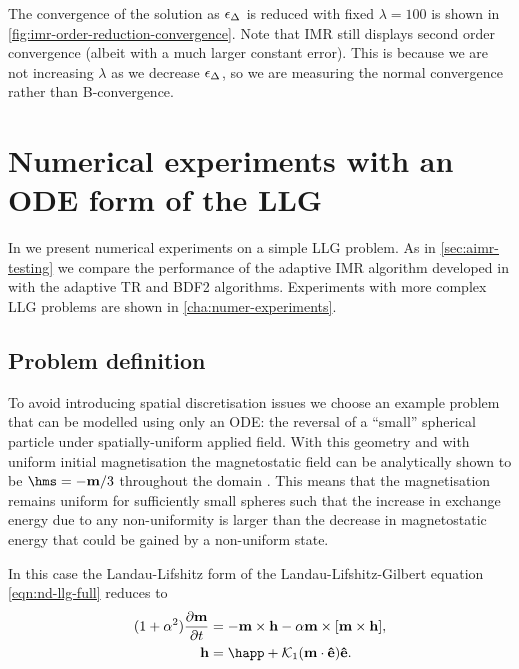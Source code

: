 The convergence of the solution as $\epsilon_{\Delta_{}}$ is reduced with fixed $\lambda = 100$ is shown in \cref{fig:imr-order-reduction-convergence}.
Note that IMR still displays second order convergence (albeit with a much larger constant error).
This is because we are not increasing $\lambda$ as we decrease $\epsilon_{\Delta_{}}$, so we are measuring the normal convergence rather than B-convergence.


\section{Numerical experiments with an ODE form of the LLG}
\label{sec:imr-ode-llg-numer-exper}



In  we present numerical experiments on a simple LLG problem.
As in \cref{sec:aimr-testing} we compare the performance of the adaptive IMR algorithm developed in  with the adaptive TR and BDF2 algorithms.
Experiments with more complex LLG problems are shown in \cref{cha:numer-experiments}.

\subsection{Problem definition}

To avoid introducing spatial discretisation issues we choose an example problem that can be modelled using only an ODE: the reversal of a ``small'' spherical particle under spatially-uniform applied field.
With this geometry and with uniform initial magnetisation the magnetostatic field can be analytically shown to be $\hms = -\mv/3$ throughout the domain \cite[112]{Aharoni1996}.
This means that the magnetisation remains uniform for sufficiently small spheres such that the increase in exchange energy due to any non-uniformity is larger than the decrease in magnetostatic energy that could be gained by a non-uniform state.

In this case the Landau-Lifshitz form of the Landau-Lifshitz-Gilbert equation \cref{eqn:nd-llg-full} reduces to
\begin{equation}
  \begin{aligned}
    (1 + \dampc^2) \dmdt &= - \mv \times \hv - \dampc \mv \times \bigs{\mv \times \hv}, \\
    \hv &= \happ + \kone (\mv \cdot \ev) \ev.
    \label{eqn:nd-ode-llg}
  \end{aligned}
\end{equation}

